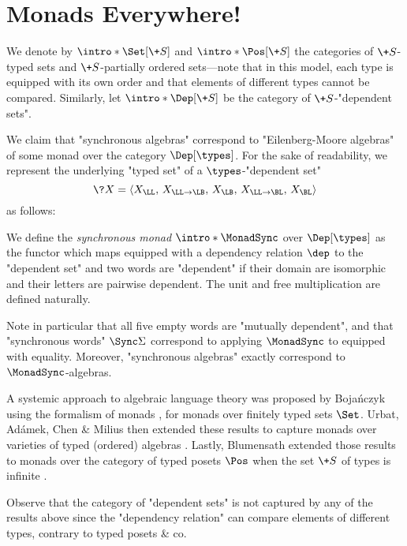 \section{Monads Everywhere!}
\label{apdx:monads}

We denote by \AP$\intro*\Set[\+S]$ and $\intro*\Pos[\+S]$ the categories of $\+S$-typed sets
and $\+S$-partially ordered sets---note that in this model,
each type is equipped with its own order and
that elements of different types cannot be compared.
Similarly, let \AP$\intro*\Dep[\+S]$ be the category of $\+S$-"dependent sets".

We claim that "synchronous algebras" correspond to "Eilenberg-Moore algebras" of some monad over the category $\Dep[\types]$. For the sake of readability, we represent the underlying
"typed set" of a 
$\types$-"dependent set"
\[\?X = \langle X_{\LL},\, X_{\LL\to\LB},\, X_{\LB},\, X_{\LL\to\BL},\, X_{\BL} \rangle\]
as follows:

We define the \emph{synchronous monad}
\AP$\intro*\MonadSync$ over $\Dep[\types]$ as the functor which maps 
equipped with a dependency relation $\dep$ to the "dependent set"
and two words are "dependent" if their domain are isomorphic
and their letters are pairwise dependent.
The unit and free multiplication are defined naturally.

Note in particular that all five empty words are "mutually dependent",
and that "synchronous words" $\Sync\Sigma$ correspond to applying
$\MonadSync$ to
\PictureTypedSet{\Sigma\times\Sigma}{\emptyset}{\Sigma\times\{\pad\}}{\emptyset}{\{\pad\}\times\Sigma,}
equipped with equality.
Moreover, "synchronous algebras" exactly correspond to $\MonadSync$-algebras.


A systemic approach to algebraic language theory was proposed by Bojańczyk using the formalism of monads \cite{bojanczyk_recognisable_2015}, for monads over finitely typed sets $\Set$.
Urbat, Adámek, Chen \& Milius then extended these results to capture monads over varieties of typed (ordered) algebras \cite{urbat_eilenberg_2017}.
Lastly, Blumensath extended those results to monads over the category of typed posets $\Pos$
when the set $\+S$ of types is infinite \cite{blumensath_algebraic_2021}. 

Observe that the category of "dependent sets" is not captured by any of the results above since
the "dependency relation" can compare elements of different types, contrary to typed posets \& co. 